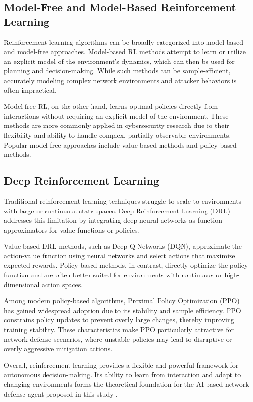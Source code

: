 \documentclass[12pt,a4paper]{report}
\begin{document}
\subsection{Model-Free and Model-Based Reinforcement Learning}

Reinforcement learning algorithms can be broadly categorized into model-based and model-free approaches.
Model-based RL methods attempt to learn or utilize an explicit model of the environment’s dynamics, which can then be used for planning and decision-making.
While such methods can be sample-efficient, accurately modeling complex network environments and attacker behaviors is often impractical.

Model-free RL, on the other hand, learns optimal policies directly from interactions without requiring an explicit model of the environment.
These methods are more commonly applied in cybersecurity research due to their flexibility and ability to handle complex, partially observable environments.
Popular model-free approaches include value-based methods and policy-based methods.

\subsection{Deep Reinforcement Learning}

Traditional reinforcement learning techniques struggle to scale to environments with large or continuous state spaces.
Deep Reinforcement Learning (DRL) addresses this limitation by integrating deep neural networks as function approximators for value functions or policies.

Value-based DRL methods, such as Deep Q-Networks (DQN), approximate the action-value function using neural networks and select actions that maximize expected rewards.
Policy-based methods, in contrast, directly optimize the policy function and are often better suited for environments with continuous or high-dimensional action spaces.

Among modern policy-based algorithms, Proximal Policy Optimization (PPO) has gained widespread adoption due to its stability and sample efficiency.
PPO constrains policy updates to prevent overly large changes, thereby improving training stability.
These characteristics make PPO particularly attractive for network defense scenarios, where unstable policies may lead to disruptive or overly aggressive mitigation actions.

Overall, reinforcement learning provides a flexible and powerful framework for autonomous decision-making.
Its ability to learn from interaction and adapt to changing environments forms the theoretical foundation for the AI-based network defense agent proposed in this study \cite{suttonBarto2018,schulmanPPO2017}.
\end{document}
